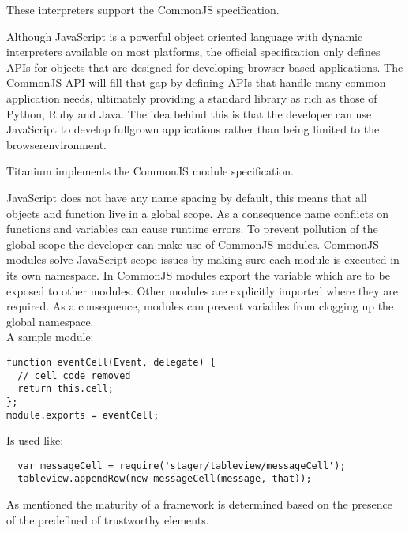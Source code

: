 These interpreters support the CommonJS specification.


Although JavaScript is a powerful object oriented language with dynamic interpreters available on most platforms, the official specification only defines APIs for objects that are designed for developing browser-based applications.
The CommonJS API will fill that gap by defining APIs that handle many common application needs, ultimately providing a standard library as rich as those of Python, Ruby and Java.\cite{CommonJS2012a} The idea behind this is that the developer can use JavaScript to develop fullgrown applications rather than being limited to the browserenvironment.

Titanium implements the CommonJS module specification.


JavaScript does not have any name spacing by default, this means that all objects and function live in a global scope. As a consequence name conflicts on functions and variables can cause runtime errors. 
To prevent pollution of the global scope the developer can make use of CommonJS modules.
CommonJS modules solve JavaScript scope issues by making sure each module is executed in its own namespace.\cite{CommonJS2012b} In CommonJS modules export the variable which are to be exposed to other modules. Other modules are explicitly imported where they are required. As a consequence, modules can prevent variables from clogging up the global namespace.
~\\
A sample module:


\begin{verbatim}
function eventCell(Event, delegate) {
  // cell code removed
  return this.cell;
};
module.exports = eventCell;
\end{verbatim}

Is used like:
\begin{verbatim}
  var messageCell = require('stager/tableview/messageCell');
  tableview.appendRow(new messageCell(message, that));
\end{verbatim}

As mentioned the maturity of a framework is determined based on the presence of the predefined of trustworthy elements.

